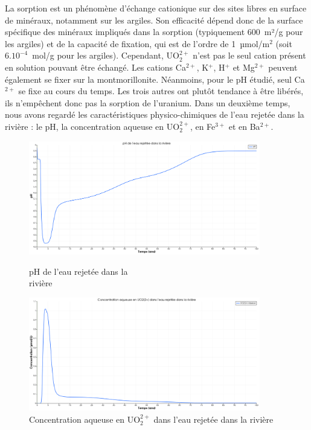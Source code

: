 \documentclass{article}
\begin{document}
La sorption est un phénomène d’échange cationique sur des sites libres en surface de minéraux, notamment sur les argiles. Son efficacité dépend donc de la surface spécifique des minéraux impliqués dans la sorption (typiquement 600~m²/g pour les argiles) et de la capacité de fixation, qui est de l’ordre de 1~µmol/m$^2$ (soit $6 . 10^{-4}$~mol/g pour les argiles). Cependant, UO$_2^{2+}$ n’est pas le seul cation présent en solution pouvant être échangé. Les cations Ca$^{2+}$, K$^{+}$, H$^{+}$ et Mg$^{2+}$ peuvent également se fixer sur la montmorillonite. Néanmoins, pour le pH étudié, seul Ca$^{2+}$ se fixe au cours du temps. Les trois autres ont plutôt tendance à être libérés, ils n’empêchent donc pas la sorption de l’uranium.
Dans un deuxième temps, nous avons regardé les caractéristiques physico-chimiques de l’eau rejetée dans la rivière : le pH, la concentration aqueuse en UO$_2^{2+}$, en Fe$^{3+}$ et en Ba$^{2+}$.

\begin{figure}[t]
    \centering
    \begin{minipage}{0.5\textwidth}
        \centering
        \includegraphics[width=0.9\textwidth]{III_B_2_5.png} 
        \caption{pH de l'eau rejetée dans la \\rivière}
        \label{fig:pH_sable_Base}
    \end{minipage}\hfill
    \begin{minipage}{0.5\textwidth}
        \centering
        \includegraphics[width=0.9\textwidth]{III_B_2_6.png} 
        \caption{Concentration aqueuse en UO$_2^{2+}$ dans l'eau rejetée dans la rivière}
        \label{fig:UO2_riviere_sable_base}
    \end{minipage}
\end{figure}
\end{document}
